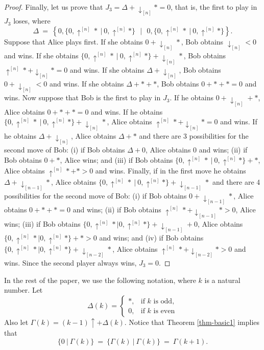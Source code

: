 \documentclass[a4paper,11pt]{article}
\begin{document}
\begin{proof}
Finally, let us prove that $J_3 = \Delta+\downarrow_{[n]}*=0$, that is, the first to play in $J_3$ loses, where
\[
\Delta\ =\ \left\{0,\{0,\uparrow^{[n]}*\ |\ 0,\uparrow^{[n]}*\}\ \ \ \Big|\ \ \ 0,\{0,\uparrow^{[n]}*\ |\ 0,\uparrow^{[n]}*\}\right\}.
\]
Suppose that Alice plays first. If she obtains $0+\downarrow_{[n]}*$, Bob obtains $\downarrow_{[n]}<0$ and wins.
If she obtains $\{0,\uparrow^{[n]}*\ |\ 0,\uparrow^{[n]}*\}+\downarrow_{[n]}*$, Bob obtains $\uparrow^{[n]}*+\downarrow_{[n]}*=0$ and wins.
If she obtains $\Delta+\downarrow_{[n]}$, Bob obtains $0+\downarrow_{[n]}<0$ and wins.
If she obtains $\Delta+*+*$, Bob obtains $0+*+*=0$ and wins.
Now suppose that Bob is the first to play in $J_3$.
If he obtains $0+\downarrow_{[n]}+*$, Alice obtains $0+*+*=0$ and wins.
If he obtains $\{0,\uparrow^{[n]}*\ |\ 0,\uparrow^{[n]}*\}+\downarrow_{[n]}*$, Alice obtains $\uparrow^{[n]}*+\downarrow_{[n]}*=0$ and wins.
If he obtains $\Delta+\downarrow_{[n]}$, Alice obtains $\Delta+*$ and  there are 3 possibilities for the second move of Bob: (i) if Bob obtains $\Delta+0$, Alice obtains $0$ and wins; (ii) if Bob obtains $0+*$, Alice wins; and (iii) if Bob obtains $\{0,\uparrow^{[n]}*\ |\ 0,\uparrow^{[n]}*\}+*$, Alice obtains $\uparrow^{[n]}*+*>0$ and wins.
Finally, if in the first move he obtains $\Delta+\downarrow_{[n-1]}*$, Alice obtains $\{0,\uparrow^{[n]}*\ |\ 0,\uparrow^{[n]}*\}+\downarrow_{[n-1]}*$ and there are 4 possibilities for the second move of Bob: (i) if Bob obtains $0+\downarrow_{[n-1]}*$, Alice obtains $0+*+*=0$ and wins; (ii) if Bob obtains $\uparrow^{[n]}*+\downarrow_{[n-1]}*>0$, Alice wins; (iii) if Bob obtains $\{0,\uparrow^{[n]}*|0,\uparrow^{[n]}*\}+\downarrow_{[n-1]}+0$, Alice obtains $\{0,\uparrow^{[n]}*|0,\uparrow^{[n]}*\}+*>0$ and wins; and (iv) if Bob obtains $\{0,\uparrow^{[n]}*|0,\uparrow^{[n]}*\}+\downarrow_{[n-2]}*$, Alice obtains $\uparrow^{[n]}*+\downarrow_{[n-2]}*>0$ and wins.
Since the second player always wins, $J_3=0$.
\end{proof}

In the rest of the paper, we use the following notation, where $k$ is a natural number. Let
\[
\Delta(k)=
\begin{cases}
    *,&\mbox{if $k$ is odd},\\
    0,&\mbox{if $k$ is even}
\end{cases}
\]
Also let $\Gamma(k)=(k-1)\uparrow+\Delta(k)$.
Notice that Theorem \ref{thm-basic1} implies that
\[
\{0\ |\ \Gamma(k)\}\ =\ \{\Gamma(k)\ |\ \Gamma(k)\}\ =\ \Gamma(k+1).
\]


\end{document}
